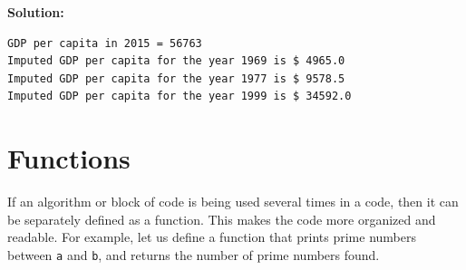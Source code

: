 \documentclass[
  letterpaper,
  DIV=11,
  numbers=noendperiod]{scrreprt}
\newenvironment{Shaded}{\begin{snugshade}}{\end{snugshade}}
\newcommand{\BuiltInTok}[1]{\textcolor[rgb]{0.00,0.23,0.31}{#1}}
\newcommand{\ControlFlowTok}[1]{\textcolor[rgb]{0.00,0.23,0.31}{#1}}
\newcommand{\DecValTok}[1]{\textcolor[rgb]{0.68,0.00,0.00}{#1}}
\newcommand{\KeywordTok}[1]{\textcolor[rgb]{0.00,0.23,0.31}{#1}}
\newcommand{\NormalTok}[1]{\textcolor[rgb]{0.00,0.23,0.31}{#1}}
\newcommand{\OperatorTok}[1]{\textcolor[rgb]{0.37,0.37,0.37}{#1}}
\newcommand{\StringTok}[1]{\textcolor[rgb]{0.13,0.47,0.30}{#1}}
\begin{document}
\textbf{Solution:}

\begin{Shaded}
\end{Shaded}

\begin{verbatim}
GDP per capita in 2015 = 56763
Imputed GDP per capita for the year 1969 is $ 4965.0
Imputed GDP per capita for the year 1977 is $ 9578.5
Imputed GDP per capita for the year 1999 is $ 34592.0
\end{verbatim}

\hypertarget{functions}{%
\section{Functions}\label{functions}}

If an algorithm or block of code is being used several times in a code,
then it can be separately defined as a function. This makes the code
more organized and readable. For example, let us define a function that
prints prime numbers between \texttt{a} and \texttt{b}, and returns the
number of prime numbers found.
\end{document}
